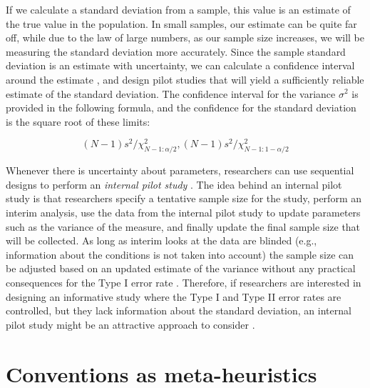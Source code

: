 \documentclass[
  oneside]{krantz}
\begin{document}
If we calculate a standard deviation from a sample, this value is an estimate of the true value in the population. In small samples, our estimate can be quite far off, while due to the law of large numbers, as our sample size increases, we will be measuring the standard deviation more accurately. Since the sample standard deviation is an estimate with uncertainty, we can calculate a confidence interval around the estimate \citep{smithson_confidence_2003}, and design pilot studies that will yield a sufficiently reliable estimate of the standard deviation. The confidence interval for the variance \(\sigma^2\) is provided in the following formula, and the confidence for the standard deviation is the square root of these limits:

\[(N - 1)s^2/\chi^2_{N-1:\alpha/2},(N - 1)s^2/\chi^2_{N-1:1-\alpha/2}\]

Whenever there is uncertainty about parameters, researchers can use sequential designs to perform an \emph{internal pilot study} \citep{wittes_role_1990}. The idea behind an internal pilot study is that researchers specify a tentative sample size for the study, perform an interim analysis, use the data from the internal pilot study to update parameters such as the variance of the measure, and finally update the final sample size that will be collected. As long as interim looks at the data are blinded (e.g., information about the conditions is not taken into account) the sample size can be adjusted based on an updated estimate of the variance without any practical consequences for the Type I error rate \citep{friede_sample_2006, proschan_two-stage_2005}. Therefore, if researchers are interested in designing an informative study where the Type I and Type II error rates are controlled, but they lack information about the standard deviation, an internal pilot study might be an attractive approach to consider \citep{chang_adaptive_2016}.

\hypertarget{conventions-as-meta-heuristics}{%
\section{Conventions as meta-heuristics}\label{conventions-as-meta-heuristics}}
\end{document}
